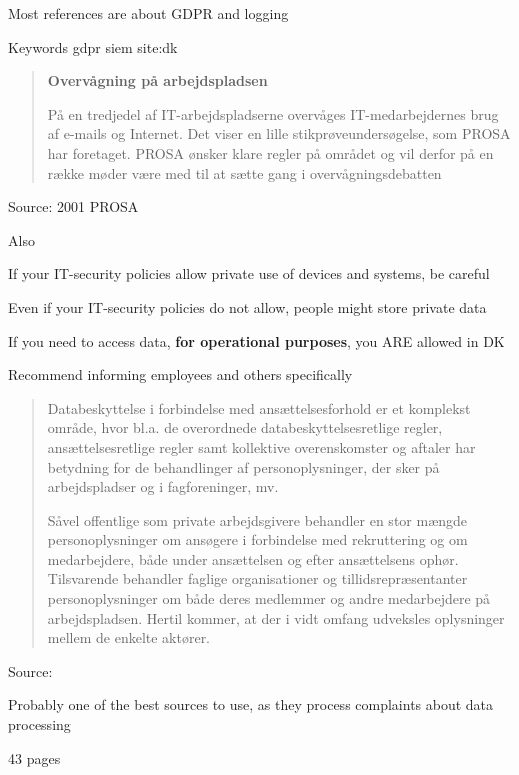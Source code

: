 \documentclass[Screen16to9,17pt]{foils}
\begin{document}
\begin{list2}
\item Most references are about GDPR and logging
\item Keywords gdpr siem site:dk
  \item {}
\end{list2}




\begin{quote}{\bf
  Overvågning på arbejdspladsen}

  På en tredjedel af IT-arbejdspladserne overvåges IT-medarbejdernes brug af e-mails og Internet. Det viser en lille stikprøveundersøgelse, som PROSA har foretaget. PROSA ønsker klare regler på området og vil derfor på en række møder være med til at sætte gang i overvågningsdebatten
\end{quote}
Source: 2001 PROSA {\footnotesize{}}

\begin{list2}
  \item Also {\footnotesize{}}
\item If your IT-security policies allow private use of devices and systems, be careful
\item Even if your IT-security policies do not allow, people might store private data
\item If you need to access data, {\bf for operational purposes}, you ARE allowed in DK
\item Recommend informing employees and others specifically
\end{list2}



\begin{quote}
Databeskyttelse i forbindelse med ansættelsesforhold er et komplekst område, hvor bl.a. de overordnede databeskyttelsesretlige regler, ansættelsesretlige regler samt kollektive overenskomster og aftaler har betydning for de behandlinger af personoplysninger, der sker på arbejdspladser og i fagforeninger, mv.

Såvel offentlige som private arbejdsgivere behandler en stor mængde personoplysninger om ansøgere i forbindelse med rekruttering og om medarbejdere, både under ansættelsen og efter ansættelsens ophør. Tilsvarende behandler faglige organisationer og tillidsrepræsentanter personoplysninger om både deres medlemmer og andre medarbejdere på arbejdspladsen. Hertil kommer, at der i vidt omfang udveksles oplysninger mellem de enkelte aktører.
\end{quote}
Source: {\footnotesize{}}

\begin{list2}
\item Probably one of the best sources to use, as they process complaints about data processing
\item 43 pages
\end{list2}




\slidenext{}
\end{document}
